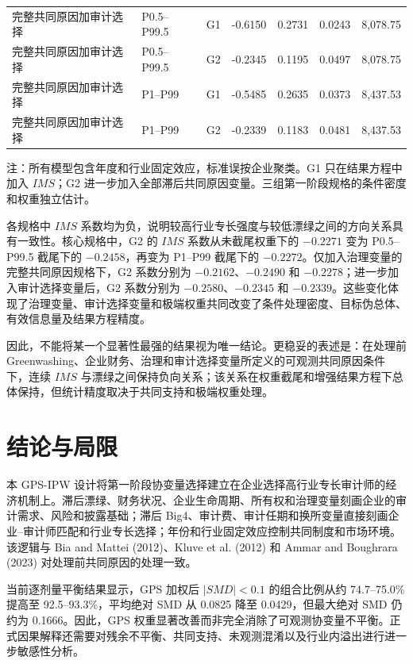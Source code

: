 \documentclass[11pt]{article}
\begin{document}
\begin{table}[htbp]
\begin{threeparttable}
\begin{tabular}{llrrrcr}
完整共同原因加审计选择 & P0.5--P99.5 & G1 & -0.6150 & 0.2731 & 0.0243 & 8,078.75 \\
完整共同原因加审计选择 & P0.5--P99.5 & G2 & -0.2345 & 0.1195 & 0.0497 & 8,078.75 \\
完整共同原因加审计选择 & P1--P99 & G1 & -0.5485 & 0.2635 & 0.0373 & 8,437.53 \\
完整共同原因加审计选择 & P1--P99 & G2 & -0.2339 & 0.1183 & 0.0481 & 8,437.53 \\
\bottomrule
\end{tabular}
\begin{tablenotes}\footnotesize
\item 注：所有模型包含年度和行业固定效应，标准误按企业聚类。G1 只在结果方程中加入 $IMS$；G2 进一步加入全部滞后共同原因变量。三组第一阶段规格的条件密度和权重独立估计。
\end{tablenotes}
\end{threeparttable}
\end{table}

各规格中 $IMS$ 系数均为负，说明较高行业专长强度与较低漂绿之间的方向关系具有一致性。核心规格中，G2 的 $IMS$ 系数从未截尾权重下的 $-0.2271$ 变为 P0.5--P99.5 截尾下的 $-0.2458$，再变为 P1--P99 截尾下的 $-0.2272$。仅加入治理变量的完整共同原因规格下，G2 系数分别为 $-0.2162$、$-0.2490$ 和 $-0.2278$；进一步加入审计选择变量后，G2 系数分别为 $-0.2580$、$-0.2345$ 和 $-0.2339$。这些变化体现了治理变量、审计选择变量和极端权重共同改变了条件处理密度、目标伪总体、有效信息量及结果方程精度。

因此，不能将某一个显著性最强的结果视为唯一结论。更稳妥的表述是：在处理前 Greenwashing、企业财务、治理和审计选择变量所定义的可观测共同原因条件下，连续 $IMS$ 与漂绿之间保持负向关系；该关系在权重截尾和增强结果方程下总体保持，但统计精度取决于共同支持和极端权重处理。

\section{结论与局限}

本 GPS-IPW 设计将第一阶段协变量选择建立在企业选择高行业专长审计师的经济机制上。滞后漂绿、财务状况、企业生命周期、所有权和治理变量刻画企业的审计需求、风险和披露基础；滞后 Big4、审计费、审计任期和换所变量直接刻画企业--审计师匹配和行业专长选择；年份和行业固定效应控制共同制度和市场环境。该逻辑与 Bia and Mattei (2012)、Kluve et al. (2012) 和 Ammar and Boughrara (2023) 对处理前共同原因的处理一致。

当前逐剂量平衡结果显示，GPS 加权后 $|SMD|<0.1$ 的组合比例从约 74.7--75.0\% 提高至 92.5--93.3\%，平均绝对 SMD 从 0.0825 降至 0.0429，但最大绝对 SMD 仍约为 0.1666。因此，GPS 权重显著改善而非完全消除了可观测协变量不平衡。正式因果解释还需要对残余不平衡、共同支持、未观测混淆以及行业内溢出进行进一步敏感性分析。
\end{document}
